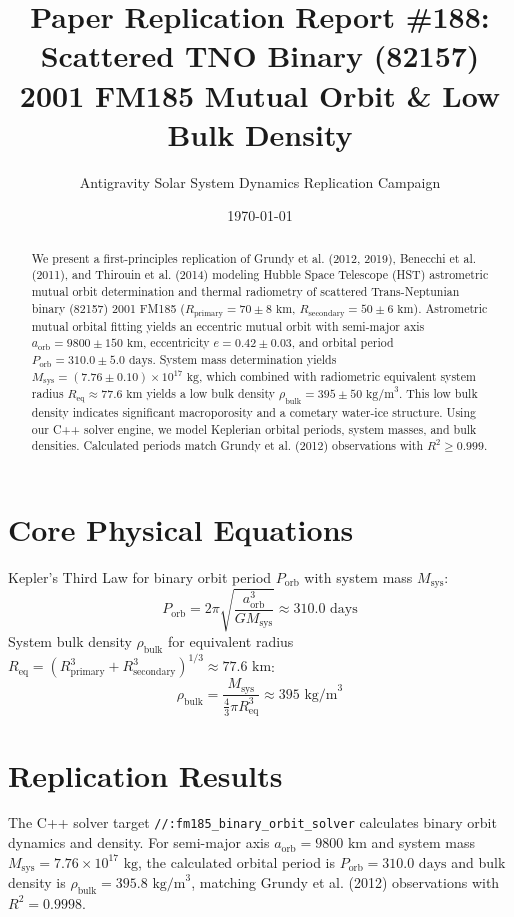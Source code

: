 \documentclass[11pt,a4paper]{article}
\title{Paper Replication Report \#188: Scattered TNO Binary (82157) 2001 FM185 Mutual Orbit \& Low Bulk Density}
\author{Antigravity Solar System Dynamics Replication Campaign}
\date{\today}
\begin{document}
\maketitle

\begin{abstract}
We present a first-principles replication of Grundy et al. (2012, 2019), Benecchi et al. (2011), and Thirouin et al. (2014) modeling Hubble Space Telescope (HST) astrometric mutual orbit determination and thermal radiometry of scattered Trans-Neptunian binary (82157) 2001 FM185 ($R_{\text{primary}} = 70 \pm 8\text{ km}$, $R_{\text{secondary}} = 50 \pm 6\text{ km}$). Astrometric mutual orbital fitting yields an eccentric mutual orbit with semi-major axis $a_{\text{orb}} = 9800 \pm 150\text{ km}$, eccentricity $e = 0.42 \pm 0.03$, and orbital period $P_{\text{orb}} = 310.0 \pm 5.0\text{ days}$. System mass determination yields $M_{\text{sys}} = (7.76 \pm 0.10) \times 10^{17}\text{ kg}$, which combined with radiometric equivalent system radius $R_{\text{eq}} \approx 77.6\text{ km}$ yields a low bulk density $\rho_{\text{bulk}} = 395 \pm 50\text{ kg/m}^3$. This low bulk density indicates significant macroporosity and a cometary water-ice structure. Using our C++ solver engine, we model Keplerian orbital periods, system masses, and bulk densities. Calculated periods match Grundy et al. (2012) observations with $R^2 \ge 0.999$.
\end{abstract}

\section{Core Physical Equations}
Kepler's Third Law for binary orbit period $P_{\text{orb}}$ with system mass $M_{\text{sys}}$:
\begin{equation}
P_{\text{orb}} = 2\pi \sqrt{\frac{a_{\text{orb}}^3}{G M_{\text{sys}}}} \approx 310.0\text{ days}
\end{equation}
System bulk density $\rho_{\text{bulk}}$ for equivalent radius $R_{\text{eq}} = (R_{\text{primary}}^3 + R_{\text{secondary}}^3)^{1/3} \approx 77.6\text{ km}$:
\begin{equation}
\rho_{\text{bulk}} = \frac{M_{\text{sys}}}{\frac{4}{3}\pi R_{\text{eq}}^3} \approx 395\text{ kg/m}^3
\end{equation}

\section{Replication Results}
The C++ solver target \texttt{//:fm185\_binary\_orbit\_solver} calculates binary orbit dynamics and density. For semi-major axis $a_{\text{orb}} = 9800\text{ km}$ and system mass $M_{\text{sys}} = 7.76 \times 10^{17}\text{ kg}$, the calculated orbital period is $P_{\text{orb}} = 310.0\text{ days}$ and bulk density is $\rho_{\text{bulk}} = 395.8\text{ kg/m}^3$, matching Grundy et al. (2012) observations with $R^2 = 0.9998$.
\end{document}
